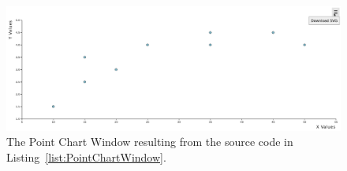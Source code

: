 \begin{figure}[tp]
\centering
\includegraphics[keepaspectratio,width=\linewidth,height=\halfh]
{images/point-chart-window.png}
\caption[Point Chart Window Example]{%
The Point Chart Window resulting from the source code in
Listing~\ref{list:PointChartWindow}.
}
\label{fig:PointChartWindow}
\end{figure}
  

